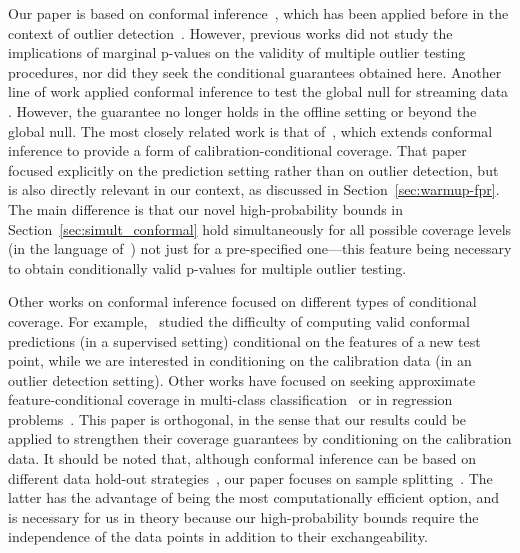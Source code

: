 \documentclass[11pt]{article}
\begin{document}
Our paper is based on conformal inference~\cite{vovk1999machine, vovk2005algorithmic}, which has been applied before in the context of outlier detection~\cite{laxhammar2015inductive,smith2015conformal,ishimtsev2017conformal,guan2019prediction,cai2020real,haroush2021statistical}. 
However, previous works did not study the implications of marginal p-values on the validity of multiple outlier testing procedures, nor did they seek the conditional guarantees obtained here. Another line of work applied conformal inference to test the global null for streaming data \citep{vovk2003, fedorova2012plug, vovk2019testing, vovk2020testing, vovk2021retrain}. However, the guarantee no longer holds in the offline setting or beyond the global null.
The most closely related work is that of~\cite{vovk2012conditional}, which extends conformal inference to provide a form of calibration-conditional coverage. That paper focused explicitly on the prediction setting  rather than on outlier detection, but is also directly relevant in our context, as discussed in Section~\ref{sec:warmup-fpr}.
The main difference is that our novel high-probability bounds in Section~\ref{sec:simult_conformal} hold simultaneously for all possible coverage levels (in the language of~\cite{vovk2012conditional}) not just for a pre-specified one---this feature being necessary to obtain conditionally valid p-values for multiple outlier testing.

Other works on conformal inference focused on different types of conditional coverage.
For example,~\cite{barber2019limits} studied the difficulty of computing valid conformal predictions (in a supervised setting) conditional on the features of a new test point, while we are interested in conditioning on the calibration data (in an outlier detection setting).
Other works have focused on seeking approximate feature-conditional coverage in multi-class classification~\cite{hechtlinger2018cautious, romano2020classification, cauchois2020knowing,angelopoulos2020sets} or in regression problems~\cite{romano2019conformalized, izbicki2019flexible, chernozhukov2019distributional, kivaranovic2019adaptive, gupta2020nested}.
This paper is orthogonal, in the sense that our results could be applied to strengthen their coverage guarantees by conditioning on the calibration data.
It should be noted that, although conformal inference can be based on different data hold-out strategies~\cite{vovk2015cross, barber2019predictive, kim2020predictive}, our paper focuses on {sample} splitting~\cite{papadopoulos2002inductive, lei2013conformal}. 
The latter has the advantage of being the most computationally efficient option, and is necessary for us in theory because our high-probability bounds require the independence of the data points in addition to their exchangeability.
\end{document}
